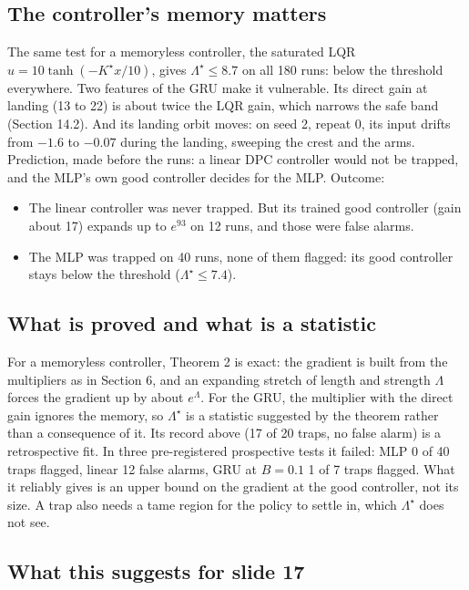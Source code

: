 \documentclass[11pt]{article}
\begin{document}
\subsection{The controller's memory matters}

The same test for a memoryless controller, the saturated LQR $u=10\tanh(-K^\star x/10)$, gives $\Lambda^\star\le8.7$ on all 180 runs: below the threshold everywhere. Two features of the GRU make it vulnerable. Its direct gain at landing (13 to 22) is about twice the LQR gain, which narrows the safe band (Section 14.2). And its landing orbit moves: on seed 2, repeat 0, its input drifts from $-1.6$ to $-0.07$ during the landing, sweeping the crest and the arms. Prediction, made before the runs: a linear DPC controller would not be trapped, and the MLP's own good controller decides for the MLP. Outcome:
\begin{itemize}
\item The linear controller was never trapped. But its trained good controller (gain about 17) expands up to $e^{93}$ on 12 runs, and those were false alarms.
\item The MLP was trapped on 40 runs, none of them flagged: its good controller stays below the threshold ($\Lambda^\star\le7.4$).
\end{itemize}

\subsection{What is proved and what is a statistic}

For a memoryless controller, Theorem 2 is exact: the gradient is built from the multipliers as in Section 6, and an expanding stretch of length and strength $\Lambda$ forces the gradient up by about $e^{\Lambda}$. For the GRU, the multiplier with the direct gain ignores the memory, so $\Lambda^\star$ is a statistic suggested by the theorem rather than a consequence of it. Its record above (17 of 20 traps, no false alarm) is a retrospective fit. In three pre-registered prospective tests it failed: MLP 0 of 40 traps flagged, linear 12 false alarms, GRU at $B=0.1$ 1 of 7 traps flagged. What it reliably gives is an upper bound on the gradient at the good controller, not its size. A trap also needs a tame region for the policy to settle in, which $\Lambda^\star$ does not see.

\subsection{What this suggests for slide 17}
\end{document}
